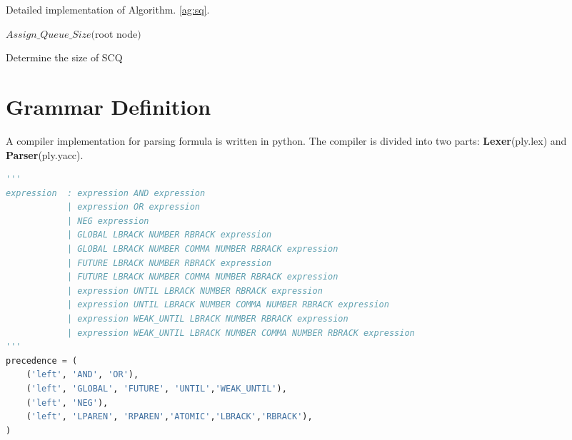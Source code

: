 Detailed implementation of Algorithm. \ref{ag:sq}.
\begin{algorithm}
\SetAlgoLined
{}

$Assign\_Queue\_Size($root node$)$\;
 \caption{\label{ag:sq_d}Determine the size of SCQ}
\end{algorithm}




\section*{\mltl Grammar Definition}
A compiler implementation for parsing \mltl formula is written in python. The compiler is divided into two parts: \textbf{Lexer}(ply.lex) and \textbf{Parser}(ply.yacc). 
\begin{lstlisting}[language=Python,basicstyle=\small]
'''
expression 	: expression AND expression
            | expression OR expression
            | NEG expression
            | GLOBAL LBRACK NUMBER RBRACK expression
            | GLOBAL LBRACK NUMBER COMMA NUMBER RBRACK expression
            | FUTURE LBRACK NUMBER RBRACK expression
            | FUTURE LBRACK NUMBER COMMA NUMBER RBRACK expression
            | expression UNTIL LBRACK NUMBER RBRACK expression
            | expression UNTIL LBRACK NUMBER COMMA NUMBER RBRACK expression
            | expression WEAK_UNTIL LBRACK NUMBER RBRACK expression
            | expression WEAK_UNTIL LBRACK NUMBER COMMA NUMBER RBRACK expression			
'''
precedence = (
    ('left', 'AND', 'OR'),
    ('left', 'GLOBAL', 'FUTURE', 'UNTIL','WEAK_UNTIL'),	
    ('left', 'NEG'),
    ('left', 'LPAREN', 'RPAREN','ATOMIC','LBRACK','RBRACK'),
)
\end{lstlisting}